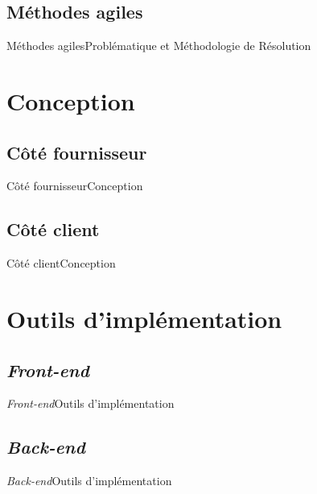 \documentclass{beamer}
\begin{document}
\subsection{Méthodes agiles}
\begin{frame}{Méthodes agiles}{Problématique et Méthodologie de Résolution}
\end{frame}
\section{Conception}
\subsection{Côté fournisseur}
\begin{frame}{Côté fournisseur}{Conception}
\end{frame}

\subsection{Côté client}
\begin{frame}{Côté client}{Conception}
\end{frame}

\section{Outils d'implémentation}
\subsection{\protect\textit{Front-end}}
\begin{frame}{\textit{Front-end}}{Outils d'implémentation}
\end{frame}

\subsection{\protect\textit{Back-end}}
\begin{frame}{\textit{Back-end}}{Outils d'implémentation}
\end{frame}
\end{document}
